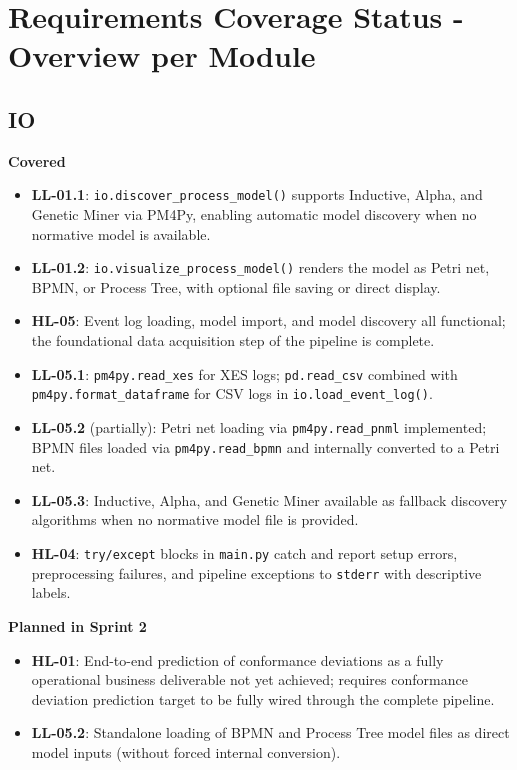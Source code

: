 \documentclass[12pt,a4paper]{article}
\begin{document}
\section{Requirements Coverage Status - Overview per Module}

\subsection{IO}
\textbf{Covered}
\begin{itemize}
    \item \textbf{LL-01.1}: \texttt{io.discover\_process\_model()} supports Inductive, Alpha, and Genetic Miner via PM4Py, enabling automatic model discovery when no normative model is available.
    \item \textbf{LL-01.2}: \texttt{io.visualize\_process\_model()} renders the model as Petri net, BPMN, or Process Tree, with optional file saving or direct display.
    \item \textbf{HL-05}: Event log loading, model import, and model discovery all functional; the foundational data acquisition step of the pipeline is complete.
    \item \textbf{LL-05.1}: \texttt{pm4py.read\_xes} for XES logs; \texttt{pd.read\_csv} combined with \texttt{pm4py.format\_dataframe} for CSV logs in \texttt{io.load\_event\_log()}.
    \item \textbf{LL-05.2} (partially): Petri net loading via \texttt{pm4py.read\_pnml} implemented; BPMN files loaded via \texttt{pm4py.read\_bpmn} and internally converted to a Petri net.
    \item \textbf{LL-05.3}: Inductive, Alpha, and Genetic Miner available as fallback discovery algorithms when no normative model file is provided.
    \item \textbf{HL-04}: \texttt{try/except} blocks in \texttt{main.py} catch and report setup errors, preprocessing failures, and pipeline exceptions to \texttt{stderr} with descriptive labels.
\end{itemize}

\noindent \textbf{Planned in Sprint 2}
\begin{itemize}
    \item \textbf{HL-01}: End-to-end prediction of conformance deviations as a fully operational business deliverable not yet achieved; requires conformance deviation prediction target to be fully wired through the complete pipeline.
    \item \textbf{LL-05.2}: Standalone loading of BPMN and Process Tree model files as direct model inputs (without forced internal conversion).
\end{itemize}
\end{document}
